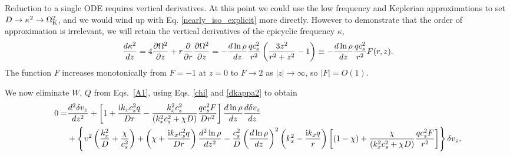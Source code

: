 Reduction to a single ODE requires vertical derivatives.  At this point we could use the 
low frequency and Keplerian approximations to set $D \rightarrow \kappa^2 \rightarrow \Omega_{\rm K}^2$,
 and we would wind up with Eq. \ref{nearly_iso_explicit} more directly.
However to demonstrate that the order of approximation is irrelevant, we will retain
the vertical derivatives of the epicyclic frequency $\kappa$,
\begin{align}\label{dkappa2}
  \frac{d\kappa^2}{d z} = 4 \frac{\partial\Omega^2}{\partial z} + r\frac{\partial}{\partial
    r}\frac{\partial\Omega^2}{\partial z} = -
  \frac{d\ln\rho}{d z}\frac{qc_s^2}{r^2} \left(
    \frac{3z^2}{r^2+z^2}-1\right) \equiv - \frac{d\ln\rho}{d z}\frac{qc_s^2}{r^2}F(r,z).
\end{align}
The function $F$ increases monotonically from $F=-1$ at $z=0$ to $F\to2$
as $|z|\to\infty $, so $|F|=O(1)$. 




We now eliminate $W,\, Q$ from Eqs.\ \ref{A1}, using  Eqs. \ref{chi} and \ref{dkappa2} to obtain  
\begin{align}\label{full_ode}
  0 =& \frac{d^2\delta v_z}{dz^2} + \left[1 + \frac{\mathrm{i} k_x c_s^2
      q}{Dr} - \frac{k_x^2c_s^2}{\left(k_x^2c_s^2 + \chi
        D\right)}\frac{qc_s^2F}{Dr^2}\right]\frac{d\ln\rho}{dz}\frac{d\delta
    v_z}{dz} \notag\\
  &+ \left\{\upsilon^2\left(\frac{k_x^2}{D} +
      \frac{\chi}{c_s^2}\right) + \left(\chi + \frac{\mathrm{i} k_x c_s^2
        q}{Dr}\right)\frac{d^2\ln\rho}{dz^2} -
    \frac{c_s^2}{D}\left(\frac{d\ln\rho}{dz}\right)^2\left(k_x^2 -
      \frac{\mathrm{i} k_x q}{r}\right)
   \left[\left(1-\chi\right) +
     \frac{\chi}{\left(k_x^2c_s^2 + \chi D\right)}\frac{qc_s^2 F}{r^2}\right] 
   \right\}\delta v_z.
\end{align}

